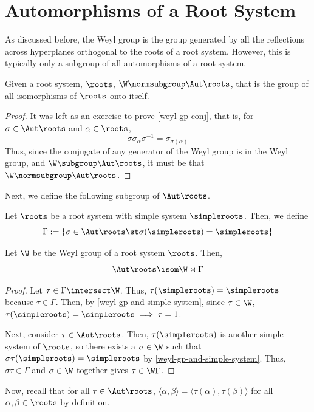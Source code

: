 \documentclass[11pt,leqno,oneside]{amsart}
\numberwithin{thm}{section}
\begin{document}
\section{Automorphisms of a Root System}
As discussed before, the Weyl group is the group generated by all the
reflections across hyperplanes orthogonal to the roots of a root
system. However, this is typically only a subgroup of all automorphisms of a
root system.
\begin{lem}
  Given a root system, \(\roots\), \(\W \normsubgroup \Aut \roots\),
  that is the group of all isomorphisms of \(\roots\) onto itself.
\end{lem}
\begin{proof}
  It was left as an exercise to prove \ref{weyl-gp-conj}, that is, for \(\sigma
  \in \Aut \roots\) and \(\alpha \in \roots\), \[
    \sigma \sigma_\alpha \sigma^{-1} = \sigma_{\sigma(\alpha)}
  \]
  Thus, since the conjugate of any generator of the Weyl group is in
  the Weyl group, and \(\W \subgroup \Aut \roots\), it must be that
  \(\W \normsubgroup \Aut \roots\).
\end{proof}
Next, we define the following subgroup of \(\Aut \roots\).
\begin{defn}
  Let \(\roots\) be a root system with simple system
  \(\simpleroots\). Then, we define \[
    \Gamma := \{\sigma \in \Aut \roots \st \sigma(\simpleroots) = \simpleroots\}
  \]
\end{defn}
\begin{prop}
  Let \(\W\) be the Weyl group of a root system \(\roots\). Then, \[
    \Aut \roots \isom \W \rtimes \Gamma
  \]
\end{prop}
\begin{proof}
  Let \(\tau \in \Gamma \intersect \W\). Thus, \(\tau(\simpleroots) =
  \simpleroots\) because \(\tau \in \Gamma\). Then, by \ref{weyl-gp-and-simple-system}, since \(\tau
  \in \W\), \(\tau(\simpleroots) = \simpleroots \implies \tau =
  1\).

  Next, consider \(\tau \in \Aut \roots\). Then,
  \(\tau(\simpleroots)\) is another simple system of \(\roots\), so
  there exists a \(\sigma \in \W\) such that \(\sigma
  \tau(\simpleroots) = \simpleroots\) by \ref{weyl-gp-and-simple-system}. Thus, \(\sigma \tau \in
  \Gamma\) and \(\sigma \in \W\) together gives \(\tau \in \W
  \Gamma\). 
\end{proof}
Now, recall that for all \(\tau \in \Aut \roots\), \(\langle
\alpha,\beta \rangle = \langle \tau(\alpha), \tau(\beta) \rangle\) for
all \(\alpha, \beta \in \roots\) by definition.
\end{document}
